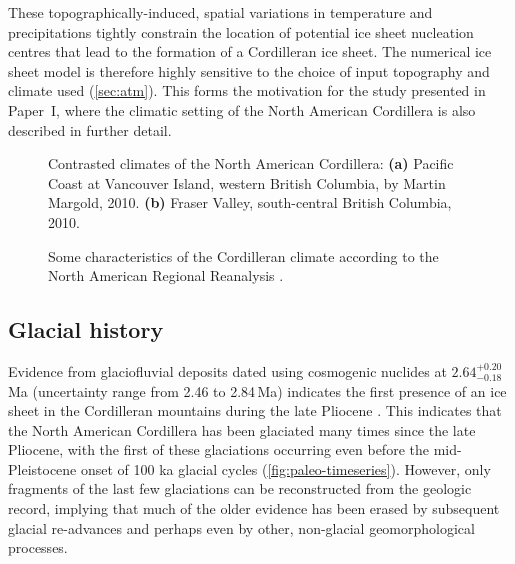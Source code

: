 \documentclass{article}
\newcommand{\CCLI}[0]{Paper~I}      %
\newcommand{\subgraphics}[3][,]{%
  \setbox1=\hbox{\texttt{[image: \#3]}}%
  \leavevmode\rlap{\usebox1}%
  \rlap{\hspace*{0.25em}
        \raisebox{\dimexpr\ht1-3ex}{\textbf{(#2)}}}%
  \phantom{\usebox1}%
}
\begin{document}
These topographically-induced, spatial variations in temperature and
precipitations tightly constrain the location of potential ice sheet nucleation
centres that lead to the formation of a Cordilleran ice sheet. The numerical
ice sheet model is therefore highly sensitive to the choice of input topography
and climate used (\cref{sec:atm}). This forms the motivation for the study
presented in \CCLI, where the climatic setting of the North American Cordillera
is also described in further detail.

\begin{figure}
  \centering
  \makebox[0pt]{
    \subgraphics{a}{photo-vancouver-island}
    \hspace{1cm}
    \subgraphics{b}{photo-fraser-valley}
  }
  \caption{Contrasted climates of the North American Cordillera:
           \textbf{(a)} Pacific Coast at Vancouver Island, western British
           Columbia, by Martin Margold, 2010.
           \textbf{(b)} Fraser Valley, south-central British Columbia, 2010.}
  \label{fig:photo-fraser-valley}
\end{figure}

\begin{figure}
  \centering
  \caption{Some characteristics of the Cordilleran climate according to the
           North American Regional Reanalysis
           \citep[NARR,][]{Mesinger.etal.2006}.}
  \label{fig:plot-atm}
\end{figure}


\subsection{Glacial history}

Evidence from glaciofluvial deposits dated using cosmogenic nuclides at
$2.64^{+0.20}_{-0.18}$\,Ma (uncertainty range from 2.46 to 2.84\,Ma)
indicates the first presence of an ice sheet in the
Cordilleran mountains during the late Pliocene \citep{Hidy.etal.2013}.
This indicates that the North American Cordillera has been glaciated many times
since the late Pliocene, with the first of these glaciations occurring even
before the mid-Pleistocene onset of 100 ka glacial cycles
(\cref{fig:paleo-timeseries}). However, only fragments of the last few
glaciations can be reconstructed from the geologic record, implying that much
of the older evidence has been erased by subsequent glacial re-advances and
perhaps even by other, non-glacial geomorphological processes.
\end{document}
